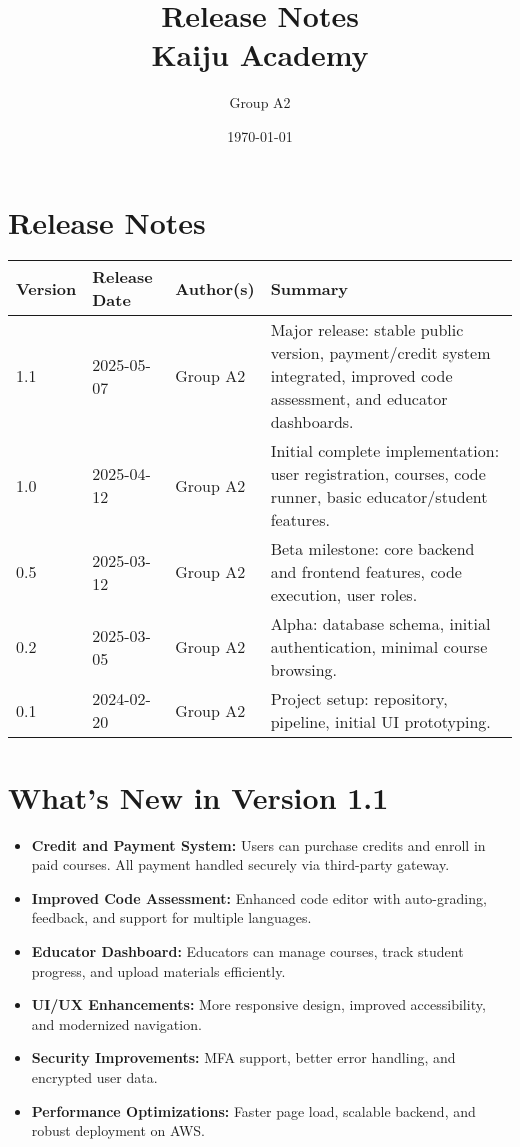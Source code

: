 \documentclass[a4paper,11pt]{scrartcl}
\title{Release Notes\\Kaiju Academy}
\author{Group A2}
\date{\today}
\begin{document}
\maketitle

\section*{Release Notes}

\begin{tabularx}{\textwidth}{l l l X}
\toprule
Version & Release Date & Author(s) & Summary \\
\midrule
1.1 & 2025-05-07 & Group A2 & Major release: stable public version, payment/credit system integrated, improved code assessment, and educator dashboards. \\
1.0 & 2025-04-12 & Group A2 & Initial complete implementation: user registration, courses, code runner, basic educator/student features. \\
0.5 & 2025-03-12 & Group A2 & Beta milestone: core backend and frontend features, code execution, user roles. \\
0.2 & 2025-03-05 & Group A2 & Alpha: database schema, initial authentication, minimal course browsing. \\
0.1 & 2024-02-20 & Group A2 & Project setup: repository, pipeline, initial UI prototyping. \\
\bottomrule
\end{tabularx}

\vspace{1.5em}

\section{What's New in Version 1.1}

\begin{itemize}[leftmargin=*]
    \item \textbf{Credit and Payment System:} Users can purchase credits and enroll in paid courses. All payment handled securely via third-party gateway.
    \item \textbf{Improved Code Assessment:} Enhanced code editor with auto-grading, feedback, and support for multiple languages.
    \item \textbf{Educator Dashboard:} Educators can manage courses, track student progress, and upload materials efficiently.
    \item \textbf{UI/UX Enhancements:} More responsive design, improved accessibility, and modernized navigation.
    \item \textbf{Security Improvements:} MFA support, better error handling, and encrypted user data.
    \item \textbf{Performance Optimizations:} Faster page load, scalable backend, and robust deployment on AWS.
\end{itemize}
\end{document}
